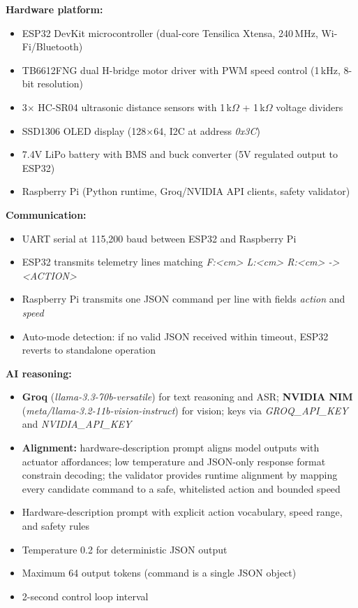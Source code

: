 \textbf{Hardware platform:}
\begin{itemize}[nosep]
  \item ESP32 DevKit microcontroller (dual-core Tensilica Xtensa, 240\,MHz, Wi-Fi/Bluetooth)
  \item TB6612FNG dual H-bridge motor driver with PWM speed control (1\,kHz, 8-bit resolution)
  \item 3$\times$ HC-SR04 ultrasonic distance sensors with 1\,k$\Omega$ + 1\,k$\Omega$ voltage dividers
  \item SSD1306 OLED display (128$\times$64, I2C at address \textit{0x3C})
  \item 7.4V LiPo battery with BMS and buck converter (5V regulated output to ESP32)
  \item Raspberry Pi (Python runtime, Groq/NVIDIA API clients, safety validator)
\end{itemize}

\textbf{Communication:}
\begin{itemize}[nosep]
  \item UART serial at 115,200 baud between ESP32 and Raspberry Pi
  \item ESP32 transmits telemetry lines matching \textit{F:\textless cm\textgreater{} L:\textless cm\textgreater{} R:\textless cm\textgreater{} -\textgreater{} \textless ACTION\textgreater}
  \item Raspberry Pi transmits one JSON command per line with fields \textit{action} and \textit{speed}
  \item Auto-mode detection: if no valid JSON received within timeout, ESP32 reverts to standalone operation
\end{itemize}

\textbf{AI reasoning:}
\begin{itemize}[nosep]
  \item \textbf{Groq} (\textit{llama-3.3-70b-versatile}) for text reasoning and ASR; \textbf{NVIDIA NIM} (\textit{meta/llama-3.2-11b-vision-instruct}) for vision; keys via \textit{GROQ\_API\_KEY} and \textit{NVIDIA\_API\_KEY}
  \item \textbf{Alignment:} hardware-description prompt aligns model outputs with actuator affordances; low temperature and JSON-only response format constrain decoding; the validator provides runtime alignment by mapping every candidate command to a safe, whitelisted action and bounded speed~\cite{huang2023grounded,ahn2022saycan}
  \item Hardware-description prompt with explicit action vocabulary, speed range, and safety rules
  \item Temperature 0.2 for deterministic JSON output
  \item Maximum 64 output tokens (command is a single JSON object)
  \item 2-second control loop interval
\end{itemize}

